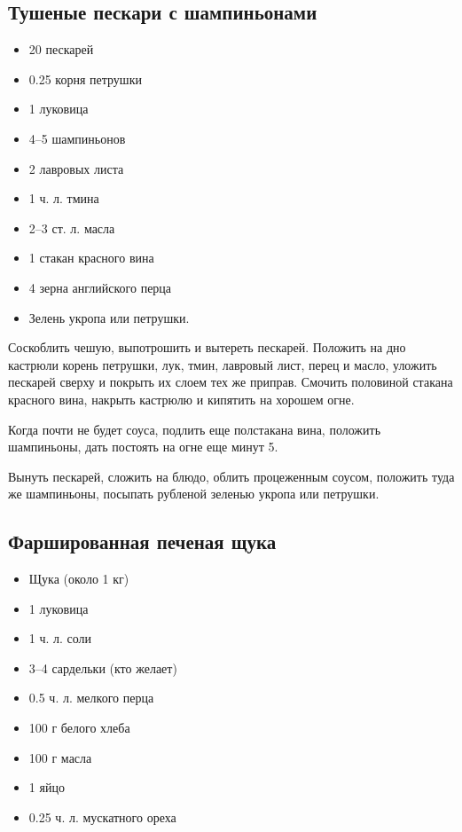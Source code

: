 \subsection{Тушеные пескари с шампиньонами}

\begin{itemize} 
	\item  20 пескарей 
    \item  0.25 корня петрушки 
    \item  1 луковица 
    \item  4–5 шампиньонов 
    \item  2 лавровых листа 
    \item  1 ч. л. тмина 
    \item  2–3 ст. л. масла 
    \item  1 стакан красного вина 
    \item  4 зерна английского перца 
    \item  Зелень укропа или петрушки.
\end{itemize}

Соскоблить чешую, выпотрошить и вытереть пескарей. Положить на дно кастрюли корень петрушки, лук, тмин, лавровый лист, перец и масло, уложить пескарей сверху и покрыть их слоем тех же приправ. Смочить половиной стакана красного вина, накрыть кастрюлю и кипятить на хорошем огне.

Когда почти не будет соуса, подлить еще полстакана вина, положить шампиньоны, дать постоять на огне еще минут 5.

Вынуть пескарей, сложить на блюдо, облить процеженным соусом, положить туда же шампиньоны, посыпать рубленой зеленью укропа или петрушки.

\subsection{Фаршированная печеная щука}

\begin{itemize} 
	\item  Щука (около 1 кг) 
    \item  1 луковица 
    \item  1 ч. л. соли 
    \item  3–4 сардельки (кто желает) 
    \item  0.5 ч. л. мелкого перца 
    \item  100 г белого хлеба 
    \item  100 г масла 
    \item  1 яйцо 
    \item  0.25 ч. л. мускатного ореха
\end{itemize}

